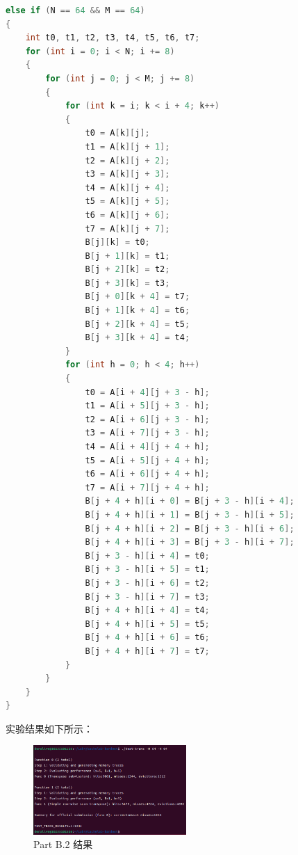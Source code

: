 \begin{lstlisting}[language = C,title= Matrix Transpose]
else if (N == 64 && M == 64)
{
    int t0, t1, t2, t3, t4, t5, t6, t7;
    for (int i = 0; i < N; i += 8)
    {
        for (int j = 0; j < M; j += 8)
        {
            for (int k = i; k < i + 4; k++)
            {
                t0 = A[k][j];
                t1 = A[k][j + 1];
                t2 = A[k][j + 2];
                t3 = A[k][j + 3];
                t4 = A[k][j + 4];
                t5 = A[k][j + 5];
                t6 = A[k][j + 6];
                t7 = A[k][j + 7];
                B[j][k] = t0;
                B[j + 1][k] = t1;
                B[j + 2][k] = t2;
                B[j + 3][k] = t3;
                B[j + 0][k + 4] = t7;
                B[j + 1][k + 4] = t6;
                B[j + 2][k + 4] = t5;
                B[j + 3][k + 4] = t4;
            }
            for (int h = 0; h < 4; h++)
            {
                t0 = A[i + 4][j + 3 - h];
                t1 = A[i + 5][j + 3 - h];
                t2 = A[i + 6][j + 3 - h];
                t3 = A[i + 7][j + 3 - h];
                t4 = A[i + 4][j + 4 + h];
                t5 = A[i + 5][j + 4 + h];
                t6 = A[i + 6][j + 4 + h];
                t7 = A[i + 7][j + 4 + h];
                B[j + 4 + h][i + 0] = B[j + 3 - h][i + 4];
                B[j + 4 + h][i + 1] = B[j + 3 - h][i + 5];
                B[j + 4 + h][i + 2] = B[j + 3 - h][i + 6];
                B[j + 4 + h][i + 3] = B[j + 3 - h][i + 7];
                B[j + 3 - h][i + 4] = t0;
                B[j + 3 - h][i + 5] = t1;
                B[j + 3 - h][i + 6] = t2;
                B[j + 3 - h][i + 7] = t3;
                B[j + 4 + h][i + 4] = t4;
                B[j + 4 + h][i + 5] = t5;
                B[j + 4 + h][i + 6] = t6;
                B[j + 4 + h][i + 7] = t7;
            }
        }
    }
}
\end{lstlisting}

实验结果如下所示：

\begin{figure} [H]
    \centering
    \includegraphics[width=0.52\textwidth]{PartB2.png}
    \caption{Part B.2 结果}
\end{figure}

